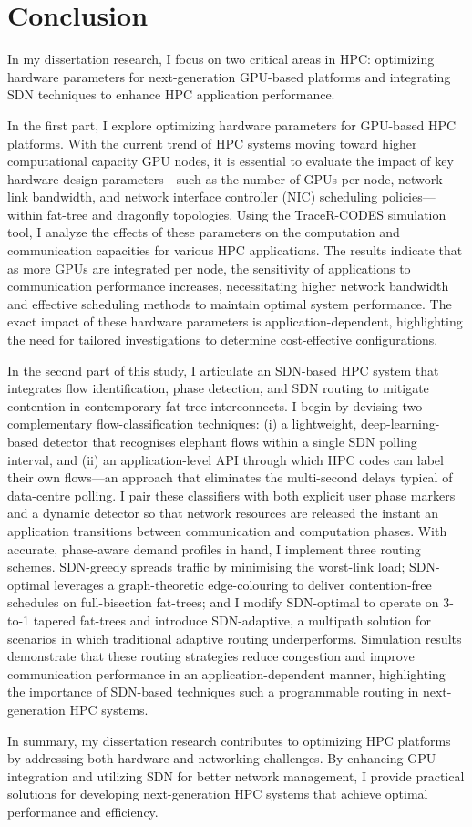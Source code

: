 \chapter{Conclusion}
In my dissertation research, I focus on two critical areas in HPC: optimizing hardware parameters for next-generation GPU-based platforms and integrating SDN techniques to enhance HPC application performance.

In the first part, I explore optimizing hardware parameters for GPU-based HPC platforms. With the current trend of HPC systems moving toward higher computational capacity GPU nodes, it is essential to evaluate the impact of key hardware design parameters—such as the number of GPUs per node, network link bandwidth, and network interface controller (NIC) scheduling policies—within fat-tree and dragonfly topologies. Using the TraceR-CODES simulation tool, I analyze the effects of these parameters on the computation and communication capacities for various HPC applications. The results indicate that as more GPUs are integrated per node, the sensitivity of applications to communication performance increases, necessitating higher network bandwidth and effective scheduling methods to maintain optimal system performance. The exact impact of these hardware parameters is application-dependent, highlighting the need for tailored investigations to determine cost-effective configurations.

In the second part of this study, I articulate an SDN-based HPC system that integrates flow identification, phase detection, and SDN routing to mitigate contention in contemporary fat-tree interconnects. I begin by devising two complementary flow-classification techniques: (i) a lightweight, deep-learning-based detector that recognises elephant flows within a single SDN polling interval, and (ii) an application-level API through which HPC codes can label their own flows—an approach that eliminates the multi-second delays typical of data-centre polling. I pair these classifiers with both explicit user phase markers and a dynamic detector so that network resources are released the instant an application transitions between communication and computation phases. With accurate, phase-aware demand profiles in hand, I implement three routing schemes. SDN-greedy spreads traffic by minimising the worst-link load; SDN-optimal leverages a graph-theoretic edge-colouring to deliver contention-free schedules on full-bisection fat-trees; and I modify SDN-optimal to operate on 3-to-1 tapered fat-trees and introduce SDN-adaptive, a multipath solution for scenarios in which traditional adaptive routing underperforms. Simulation results demonstrate that these routing strategies reduce congestion and improve communication performance in an application-dependent manner, highlighting the importance of SDN-based techniques such a  programmable routing in next-generation HPC systems.

In summary, my dissertation research contributes to optimizing HPC platforms by addressing both hardware and networking challenges. By enhancing GPU integration and utilizing SDN for better network management, I provide practical solutions for developing next-generation HPC systems that achieve optimal performance and efficiency.
